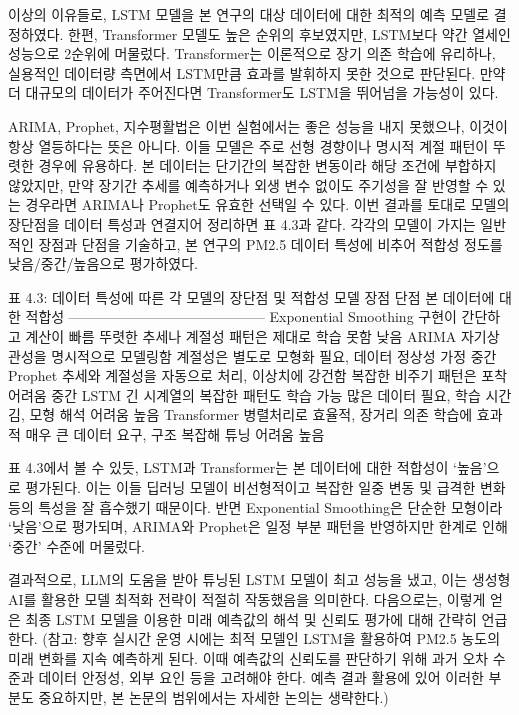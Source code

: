\documentclass[12pt,ko,a4,]{report}
\begin{document}
이상의 이유들로, LSTM 모델을 본 연구의 대상 데이터에 대한 최적의 예측
모델로 결정하였다. 한편, Transformer 모델도 높은 순위의 후보였지만,
LSTM보다 약간 열세인 성능으로 2순위에 머물렀다. Transformer는 이론적으로
장기 의존 학습에 유리하나, 실용적인 데이터량 측면에서 LSTM만큼 효과를
발휘하지 못한 것으로 판단된다. 만약 더 대규모의 데이터가 주어진다면
Transformer도 LSTM을 뛰어넘을 가능성이 있다.

ARIMA, Prophet, 지수평활법은 이번 실험에서는 좋은 성능을 내지 못했으나,
이것이 항상 열등하다는 뜻은 아니다. 이들 모델은 주로 선형 경향이나
명시적 계절 패턴이 뚜렷한 경우에 유용하다. 본 데이터는 단기간의 복잡한
변동이라 해당 조건에 부합하지 않았지만, 만약 장기간 추세를 예측하거나
외생 변수 없이도 주기성을 잘 반영할 수 있는 경우라면 ARIMA나 Prophet도
유효한 선택일 수 있다. 이번 결과를 토대로 모델의 장단점을 데이터 특성과
연결지어 정리하면 표 4.3과 같다. 각각의 모델이 가지는 일반적인 장점과
단점을 기술하고, 본 연구의 PM2.5 데이터 특성에 비추어 적합성 정도를
낮음/중간/높음으로 평가하였다.

표 4.3: 데이터 특성에 따른 각 모델의 장단점 및 적합성 \textbar{} 모델
\textbar{} 장점 \textbar{} 단점 \textbar{} 본 데이터에 대한 적합성
\textbar{}
\textbar------\textbar------\textbar------\textbar------------------------\textbar{}
\textbar{} Exponential Smoothing \textbar{} 구현이 간단하고 계산이 빠름
\textbar{} 뚜렷한 추세나 계절성 패턴은 제대로 학습 못함 \textbar{} 낮음
\textbar{} \textbar{} ARIMA \textbar{} 자기상관성을 명시적으로 모델링함
\textbar{} 계절성은 별도로 모형화 필요, 데이터 정상성 가정 \textbar{}
중간 \textbar{} \textbar{} Prophet \textbar{} 추세와 계절성을 자동으로
처리, 이상치에 강건함 \textbar{} 복잡한 비주기 패턴은 포착 어려움
\textbar{} 중간 \textbar{} \textbar{} LSTM \textbar{} 긴 시계열의 복잡한
패턴도 학습 가능 \textbar{} 많은 데이터 필요, 학습 시간 김, 모형 해석
어려움 \textbar{} 높음 \textbar{} \textbar{} Transformer \textbar{}
병렬처리로 효율적, 장거리 의존 학습에 효과적 \textbar{} 매우 큰 데이터
요구, 구조 복잡해 튜닝 어려움 \textbar{} 높음 \textbar{}

표 4.3에서 볼 수 있듯, LSTM과 Transformer는 본 데이터에 대한 적합성이
`높음'으로 평가된다. 이는 이들 딥러닝 모델이 비선형적이고 복잡한 일중
변동 및 급격한 변화 등의 특성을 잘 흡수했기 때문이다. 반면 Exponential
Smoothing은 단순한 모형이라 `낮음'으로 평가되며, ARIMA와 Prophet은 일정
부분 패턴을 반영하지만 한계로 인해 `중간' 수준에 머물렀다.

결과적으로, LLM의 도움을 받아 튜닝된 LSTM 모델이 최고 성능을 냈고, 이는
생성형 AI를 활용한 모델 최적화 전략이 적절히 작동했음을 의미한다.
다음으로는, 이렇게 얻은 최종 LSTM 모델을 이용한 미래 예측값의 해석 및
신뢰도 평가에 대해 간략히 언급한다. (참고: 향후 실시간 운영 시에는 최적
모델인 LSTM을 활용하여 PM2.5 농도의 미래 변화를 지속 예측하게 된다. 이때
예측값의 신뢰도를 판단하기 위해 과거 오차 수준과 데이터 안정성, 외부
요인 등을 고려해야 한다. 예측 결과 활용에 있어 이러한 부분도 중요하지만,
본 논문의 범위에서는 자세한 논의는 생략한다.)
\end{document}
